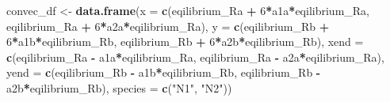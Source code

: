 \documentclass[
]{book}
\newenvironment{Shaded}{\begin{snugshade}}{\end{snugshade}}
\newcommand{\AttributeTok}[1]{\textcolor[rgb]{0.13,0.29,0.53}{#1}}
\newcommand{\DecValTok}[1]{\textcolor[rgb]{0.00,0.00,0.81}{#1}}
\newcommand{\FunctionTok}[1]{\textcolor[rgb]{0.13,0.29,0.53}{\textbf{#1}}}
\newcommand{\NormalTok}[1]{#1}
\newcommand{\OtherTok}[1]{\textcolor[rgb]{0.56,0.35,0.01}{#1}}
\newcommand{\SpecialCharTok}[1]{\textcolor[rgb]{0.81,0.36,0.00}{\textbf{#1}}}
\newcommand{\StringTok}[1]{\textcolor[rgb]{0.31,0.60,0.02}{#1}}
\begin{document}
\begin{Shaded}
\begin{Highlighting}[]
\NormalTok{convec\_df }\OtherTok{\textless{}{-}} \FunctionTok{data.frame}\NormalTok{(}\AttributeTok{x =} \FunctionTok{c}\NormalTok{(eqilibrium\_Ra }\SpecialCharTok{+} \DecValTok{6}\SpecialCharTok{*}\NormalTok{a1a}\SpecialCharTok{*}\NormalTok{eqilibrium\_Ra, }
\NormalTok{                              eqilibrium\_Ra }\SpecialCharTok{+} \DecValTok{6}\SpecialCharTok{*}\NormalTok{a2a}\SpecialCharTok{*}\NormalTok{eqilibrium\_Ra),}
                        \AttributeTok{y =} \FunctionTok{c}\NormalTok{(eqilibrium\_Rb }\SpecialCharTok{+} \DecValTok{6}\SpecialCharTok{*}\NormalTok{a1b}\SpecialCharTok{*}\NormalTok{eqilibrium\_Rb, }
\NormalTok{                              eqilibrium\_Rb }\SpecialCharTok{+} \DecValTok{6}\SpecialCharTok{*}\NormalTok{a2b}\SpecialCharTok{*}\NormalTok{eqilibrium\_Rb),}
                        \AttributeTok{xend =} \FunctionTok{c}\NormalTok{(eqilibrium\_Ra }\SpecialCharTok{{-}}\NormalTok{ a1a}\SpecialCharTok{*}\NormalTok{eqilibrium\_Ra, }
\NormalTok{                              eqilibrium\_Ra }\SpecialCharTok{{-}}\NormalTok{ a2a}\SpecialCharTok{*}\NormalTok{eqilibrium\_Ra),}
                        \AttributeTok{yend =} \FunctionTok{c}\NormalTok{(eqilibrium\_Rb }\SpecialCharTok{{-}}\NormalTok{ a1b}\SpecialCharTok{*}\NormalTok{eqilibrium\_Rb, }
\NormalTok{                              eqilibrium\_Rb }\SpecialCharTok{{-}}\NormalTok{ a2b}\SpecialCharTok{*}\NormalTok{eqilibrium\_Rb),}
                        \AttributeTok{species =} \FunctionTok{c}\NormalTok{(}\StringTok{"N1"}\NormalTok{, }\StringTok{"N2"}\NormalTok{))}


\end{Highlighting}
\end{Shaded}
\end{document}
